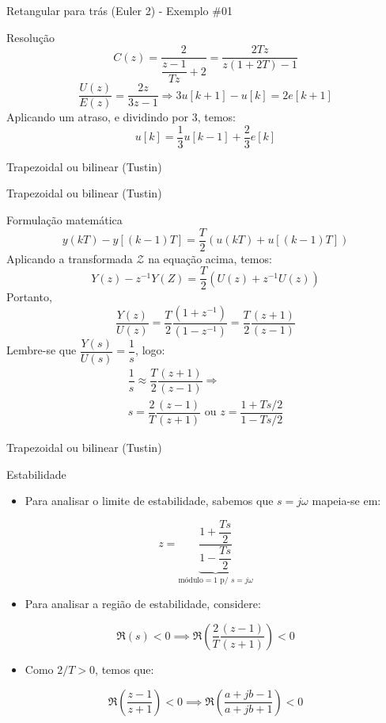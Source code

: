 \begin{frame}{Retangular para trás (Euler 2) - Exemplo \#01}
\begin{block}{Resolução}
	\[ C(z)=\dfrac{2}{\dfrac{z-1}{Tz}+2}=\dfrac{2Tz}{z(1+2T)-1} \]
	\[ \dfrac{U(z)}{E(z)}=\dfrac{\num{2}z}{\num{3}z-1}\Rightarrow \num{3}u[k+1]-u[k]=\num{2}e[k+1] \]
	Aplicando um atraso, e dividindo por $\num{3}$, temos:
	\[ u[k]=\dfrac{1}{3}u[k-1]+\dfrac{2}{3}e[k] \]
\end{block}
\end{frame}


\begin{frame}{Trapezoidal ou bilinear (Tustin)}
\centering

\vspace{-2.5cm}

\scalebox{1}{}
\end{frame}


\begin{frame}{Trapezoidal ou bilinear (Tustin)}
\begin{block}{Formulação matemática}
	\[ y(kT)-y[(k-1)T]=\dfrac{T}{2}\left( u(kT)+u[(k-1)T] \right) \]
	Aplicando a transformada $ \mathcal{Z} $ na equação acima, temos: \useshortskip
	\[ Y(z)-z^{-1}Y(Z)=\dfrac{T}{2}\left( U(z)+z^{-1}U(z) \right) \]
	Portanto, \useshortskip
	\[ \dfrac{Y(z)}{U(z)}=\dfrac{T}{2}\dfrac{(1+z^{-1})}{(1-z^{-1})}=\dfrac{T}{2}\dfrac{(z+1)}{(z-1)} \]
	Lembre-se que $ \dfrac{Y(s)}{U(s)}=\dfrac{1}{s} $, logo: \useshortskip
	\begin{gather*}
	\dfrac{1}{s}\approx\dfrac{T}{2}\dfrac{(z+1)}{(z-1)}\Rightarrow\\
	\boxed{s=\dfrac{2}{T}\dfrac{(z-1)}{(z+1)}}\text{ ou }\boxed{z=\dfrac{1+Ts/2}{1-Ts/2}}
	\end{gather*}
\end{block}
\end{frame}

\begin{frame}{Trapezoidal ou bilinear (Tustin)}
\begin{block}{Estabilidade}
\begin{itemize}
\item Para analisar o limite de estabilidade, sabemos que $ s=j\omega $ mapeia-se em:
\end{itemize}
	\[ z=\underbrace{\dfrac{1+\dfrac{Ts}{2}}{1-\dfrac{Ts}{2}}}_{\text{módulo}=1 \text{ p/ }s=j\omega} \]
\begin{itemize}
\item Para analisar a região de estabilidade, considere:
\end{itemize}
$$\Re(s) < 0 \implies \Re \left(\dfrac{2}{T}\dfrac{(z-1)}{(z+1)}\right) < 0$$
\begin{itemize}
\vspace{-0.3cm}
\item[] Como $2/T > 0$, temos que:
\end{itemize}
$$\Re \left(\dfrac{z-1}{z+1}\right) < 0 \implies \Re \left(\dfrac{a+jb-1}{a+jb+1}\right) < 0$$
\end{block}
\end{frame}

